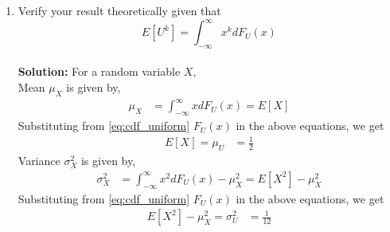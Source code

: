 \documentclass[journal,15pt,twocolumn]{IEEEtran}
\providecommand{\sbrak}[1]{\ensuremath{{}\left[#1\right]}}
\newcommand{\solution}{\noindent \textbf{Solution: }}
\begin{document}
\begin{enumerate}
Write a C program to  find the mean and variance of $U$.\\ \vspace{2mm}
\solution Source code is given below
\begin{lstlisting}
codes/chapter3/gen_samp.c
\end{lstlisting}
\textbf {Output} \vspace{2mm}
\begin{lstlisting}
Mean is: 0.500031 
Variance is: 0.083247
\end{lstlisting}
\item Verify your result theoretically given that
%
\begin{equation}
E\sbrak{U^k} = \int_{-\infty}^{\infty}x^kdF_{U}(x)
\end{equation}\\
\solution For a random variable $X$, \\ Mean $\mu_X$ is given by,
\begin{align}
	\label{eq:mean_rand}
	\mu_X & = \int_{-\infty}^{\infty}xdF_{U}(x) = E\sbrak{X}
\end{align}  
Substituting from \eqref{eq:cdf_uniform} $F_U(x)$ in the above equations, we get
\begin{align} 
	 E\sbrak{X}=\mu_U &= \frac{1}{2} 
  \end{align}
\vspace{2mm}Variance $\sigma_X^2$ is given by,
\begin{align}
\label{eq:x_var}
	\sigma_X^2 &= \int_{-\infty}^{\infty}x^2dF_{U}(x) - \mu_X^2 = E\sbrak{X^2} - \mu_X^2 
 \end{align}
Substituting from \eqref{eq:cdf_uniform} $F_U(x)$ in the above equations, we get
\begin{align} 
	E\sbrak{X^2} - \mu_X^2 =\sigma_U^2 &= \frac{1}{12}
\end{align}  \vspace{2mm}

\end{enumerate}
\end{document}
